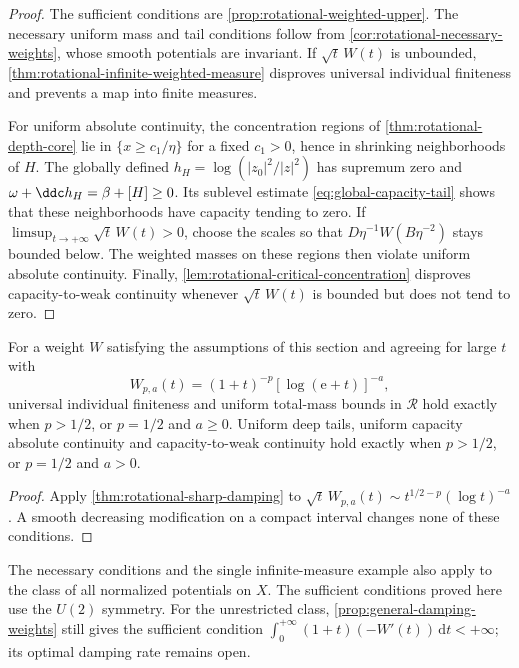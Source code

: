 \begin{proof}
The sufficient conditions are \cref{prop:rotational-weighted-upper}. The necessary uniform mass and tail conditions follow from \cref{cor:rotational-necessary-weights}, whose smooth potentials are invariant. If $\sqrt t\,W(t)$ is unbounded, \cref{thm:rotational-infinite-weighted-measure} disproves universal individual finiteness and prevents a map into finite measures.

For uniform absolute continuity, the concentration regions of \cref{thm:rotational-depth-core} lie in $\{x\geq c_1/\eta\}$ for a fixed $c_1>0$, hence in shrinking neighborhoods of $H$. The globally defined $h_H=\log(|z_0|^2/|z|^2)$ has supremum zero and $\omega+\ddc h_H=\beta+[H]\geq0$. Its sublevel estimate \eqref{eq:global-capacity-tail} shows that these neighborhoods have capacity tending to zero. If $\limsup_{t\to+\infty}\sqrt t\,W(t)>0$, choose the scales so that $D\eta^{-1}W(B\eta^{-2})$ stays bounded below. The weighted masses on these regions then violate uniform absolute continuity. Finally, \cref{lem:rotational-critical-concentration} disproves capacity-to-weak continuity whenever $\sqrt t\,W(t)$ is bounded but does not tend to zero.
\end{proof}

\begin{corollary}\label{cor:rotational-power-log-weights}
For a weight $W$ satisfying the assumptions of this section and agreeing for large $t$ with
\[
 W_{p,a}(t)=(1+t)^{-p}[\log(\mathrm e+t)]^{-a},
\]
universal individual finiteness and uniform total-mass bounds in $\mathcal R$ hold exactly when $p>1/2$, or $p=1/2$ and $a\geq0$. Uniform deep tails, uniform capacity absolute continuity and capacity-to-weak continuity hold exactly when $p>1/2$, or $p=1/2$ and $a>0$.
\end{corollary}
\begin{proof}
Apply \cref{thm:rotational-sharp-damping} to $\sqrt t\,W_{p,a}(t)\sim t^{1/2-p}(\log t)^{-a}$. A smooth decreasing modification on a compact interval changes none of these conditions.
\end{proof}

The necessary conditions and the single infinite-measure example also apply to the class of all normalized potentials on $X$. The sufficient conditions proved here use the $U(2)$ symmetry. For the unrestricted class, \cref{prop:general-damping-weights} still gives the sufficient condition $\int_0^{+\infty}(1+t)(-W'(t))\,\mathrm dt<+\infty$; its optimal damping rate remains open.
